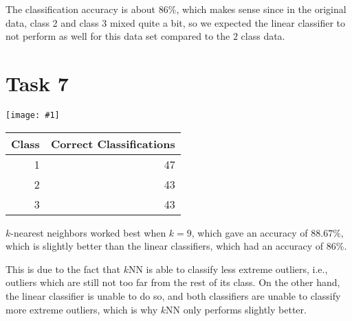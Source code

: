 \documentclass{article}
\newcommand{\image}[2]{\begin{center}\texttt{[image: \#1]}\end{center}}
\begin{document}
The classification accuracy is about $86\%$, which makes sense since in the original data, class 2 and class $3$ mixed quite a bit, so we expected the linear classifier to not perform as well for this data set compared to the $2$ class data.

\section*{Task 7}
\begin{minipage}[c]{0.5\textwidth}
	\image{images/best-knn.png}{1}
\end{minipage}
\begin{minipage}[c]{0.5\textwidth}
	\begin{center}
		\begin{tabular}{rr}
			Class & Correct Classifications \\\hline
			1 & 47 \\\hline
			2 & 43 \\\hline
			3 & 43
		\end{tabular}
	\end{center}
\end{minipage}
$k$-nearest neighbors worked best when $k = 9$, which gave an accuracy of $88.67\%$, which is slightly better than the linear classifiers, which had an accuracy of $86\%$.

This is due to the fact that $k$NN is able to classify less extreme outliers, i.e., outliers which are still not too far from the rest of its class. On the other hand, the linear classifier is unable to do so, and both classifiers are unable to classify more extreme outliers, which is why $k$NN only performs slightly better.
\end{document}

